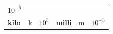 {\begin{tabular}[t]{|l|l|l|l|l|l|}
        
                \begin{math}{10}^{-6}\end{math}
     \tabularnewline\cline{1-1}\cline{2-2}\cline{3-3}\cline{4-4}\cline{5-5}\cline{6-6}
    
    
        
                \textbf{kilo}
               &
    
    
        k &
    
    
        
                \begin{math}{10}^{3}\end{math}
               &
    
    
        
                \textbf{milli}
               &
    
    
        m &
    
    
        
                \begin{math}{10}^{-3}\end{math}
     \tabularnewline\cline{1-1}\cline{2-2}\cline{3-3}\cline{4-4}\cline{5-5}\cline{6-6}
    

\end{tabular}}
